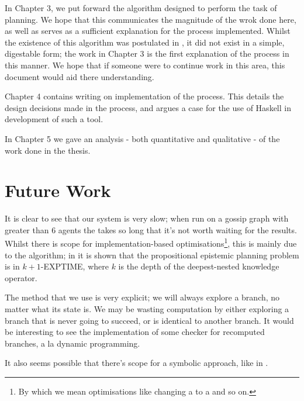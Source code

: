 \documentclass[10pt, a4paper]{report}
\begin{document}
In Chapter 3, we put forward the algorithm designed to perform the task of
planning. We hope that this communicates the magnitude of the wrok done here, as
well as serves as a sufficient explanation for the process implemented. Whilst
the existence of this algorithm was postulated in \cite{AutomataTechniques}, it
did not exist in a simple, digestable form; the work in Chapter 3 is the first
explanation of the process in this manner. We hope that if someone were to
continue work in this area, this document would aid there understanding. 

Chapter 4 contains writing on implementation of the process. This details the
design decisions made in the process, and argues a case for the use of Haskell
in development of such a tool. 

In Chapter 5 we gave an analysis - both quantitative and qualitative - of the
work done in the thesis. 

\section{Future Work}

It is clear to see that our system is very slow; when run on a gossip graph with
greater than 6 agents the takes so long that it's not worth waiting for the
results. Whilst there is scope for implementation-based
optimisations\footnote{By which we mean optimisations like changing a
   to a  and so on.}, this is mainly due to the
algorithm; in \cite{AutomataTechniques} it is shown that the propositional
epistemic planning problem is in \textsf{$k + 1$-EXPTIME}, where $k$ is the
depth of the deepest-nested knowledge operator. 

The method that we use is very explicit; we will always explore a branch, no
matter what its state is. We may be wasting computation by either exploring a
branch that is never going to succeed, or is identical to another branch. It
would be interesting to see the implementation of some checker for recomputed
branches, a la dynamic programming.

\bigskip

It also seems possible that there's scope for a symbolic approach, like in
\cite{MalvinThesis}.

\bigskip
\end{document}
